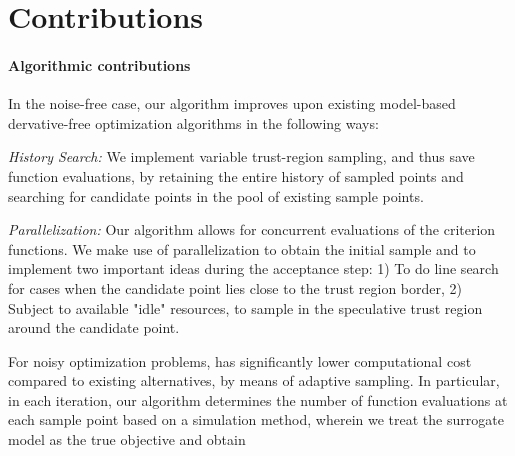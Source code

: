 \section{Contributions}
\paragraph{Algorithmic contributions} In the noise-free case, our algorithm improves upon existing model-based dervative-free optimization algorithms in the following ways:


\textit{History Search:} We implement variable trust-region sampling, and thus save function evaluations, by retaining the entire history of sampled points and searching for candidate points in the pool of existing sample points.


\textit{Parallelization:} Our algorithm allows for concurrent evaluations of the criterion functions. We make use of parallelization to obtain the initial sample and to implement two important ideas during the acceptance step: 1) To do line search for cases when the candidate point lies close to the trust region border, 2) Subject to available "idle" resources, to sample in the speculative trust region around the candidate point.

For noisy optimization problems, has significantly lower computational cost compared to existing alternatives, by means of adaptive sampling. In particular, in each iteration, our algorithm determines the number of function evaluations at each sample point based on a simulation method, wherein we treat the surrogate model as the true objective and obtain

